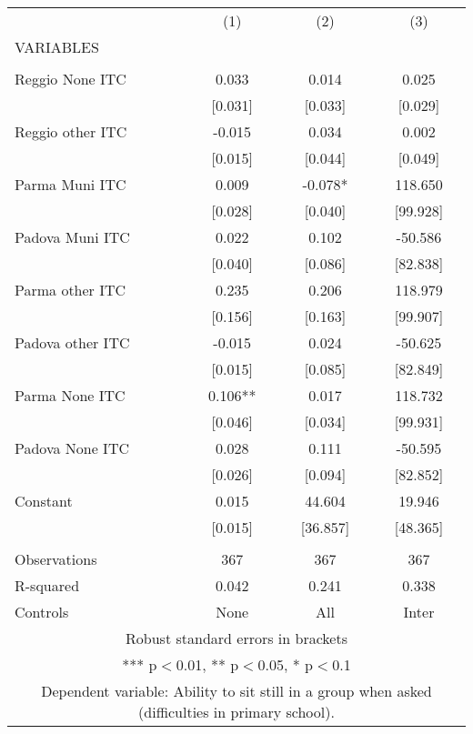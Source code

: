 \begin{tabular}{lccc} \hline
 & (1) & (2) & (3) \\
VARIABLES &  &  &  \\ \hline
 &  &  &  \\
Reggio None ITC & 0.033 & 0.014 & 0.025 \\
 & [0.031] & [0.033] & [0.029] \\
Reggio other ITC & -0.015 & 0.034 & 0.002 \\
 & [0.015] & [0.044] & [0.049] \\
Parma Muni ITC & 0.009 & -0.078* & 118.650 \\
 & [0.028] & [0.040] & [99.928] \\
Padova Muni ITC & 0.022 & 0.102 & -50.586 \\
 & [0.040] & [0.086] & [82.838] \\
Parma other ITC & 0.235 & 0.206 & 118.979 \\
 & [0.156] & [0.163] & [99.907] \\
Padova other ITC & -0.015 & 0.024 & -50.625 \\
 & [0.015] & [0.085] & [82.849] \\
Parma None ITC & 0.106** & 0.017 & 118.732 \\
 & [0.046] & [0.034] & [99.931] \\
Padova None ITC & 0.028 & 0.111 & -50.595 \\
 & [0.026] & [0.094] & [82.852] \\
Constant & 0.015 & 44.604 & 19.946 \\
 & [0.015] & [36.857] & [48.365] \\
 &  &  &  \\
Observations & 367 & 367 & 367 \\
R-squared & 0.042 & 0.241 & 0.338 \\
 Controls & None & All & Inter \\ \hline
\multicolumn{4}{c}{ Robust standard errors in brackets} \\
\multicolumn{4}{c}{ *** p$<$0.01, ** p$<$0.05, * p$<$0.1} \\
\multicolumn{4}{c}{ Dependent variable: Ability to sit still in a group when asked (difficulties in primary school).} \\
\end{tabular}
